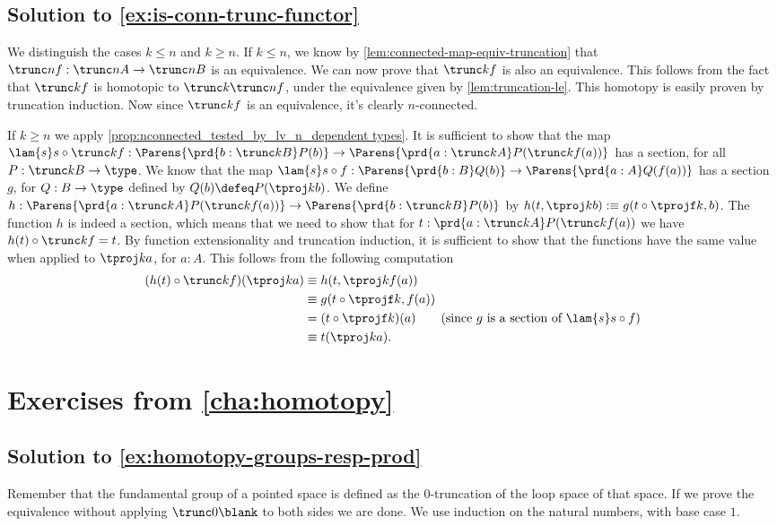 \documentclass[
%
%
11pt %
]{article}
\begin{document}
\subsection*{Solution to \cref{ex:is-conn-trunc-functor}}

We distinguish the cases $k \le n$ and $k \ge n$. If $k \le n$, we know
by \cref{lem:connected-map-equiv-truncation} that $\trunc nf : \trunc nA \to \trunc nB$ is an
equivalence. We can now prove that $\trunc kf$ is also an equivalence. This follows from the fact
that $\trunc kf$ is homotopic to $\trunc k{\trunc nf}$, under the equivalence given
by \cref{lem:truncation-le}. This homotopy is easily proven by truncation induction. Now since
$\trunc kf$ is an equivalence, it's clearly $n$-connected.

If $k \ge n$ we apply \cref{prop:nconnected_tested_by_lv_n_dependent types}. It is sufficient to
show that the map $\lam{s} s\circ \trunc kf : \Parens{\prd{b:\trunc kB}
P(b)}\to\Parens{\prd{a:\trunc kA}P(\trunc kf(a))}$ has a section, for all $P : \trunc
kB\to\type$. We know that the map $\lam{s} s\circ f :\Parens{\prd{b:B}
Q(b)}\to\Parens{\prd{a:A}Q(f(a))}$ has a section $g$, for $Q:B\to\type$ defined by $Q(b)\defeq
P(\tproj kb)$. We define $h : \Parens{\prd{a:\trunc kA}P(\trunc kf(a))}\to\Parens{\prd{b:\trunc kB}
P(b)}$ by $h(t,\tproj kb):\equiv g(t \circ \tprojf k, b)$. The function $h$ is indeed a section,
which means that we need to show that for $t : \prd{a:\trunc kA}P(\trunc kf(a))$ we have
$h(t)\circ \trunc kf = t$. By function extensionality and truncation induction, it is sufficient to
show that the functions have the same value when applied to $\tproj ka$, for $a : A$. This follows
from the following computation
\begin{align*}
  (h(t)\circ \trunc kf)(\tproj ka) & \equiv h(t, \tproj k{f(a)})\\
  & \equiv g(t \circ \tprojf k, f(a)) \\
  &= (t \circ \tprojf k)(a) \tag{since $g$ is a section of $\lam{s} s\circ f$}\\
  & \equiv t(\tproj ka).
\end{align*}

\section*{Exercises from \cref{cha:homotopy}}

\subsection*{Solution to \cref{ex:homotopy-groups-resp-prod}}
Remember that the fundamental group of a pointed space is defined as the
$0$-truncation of the loop space of that space.
If we prove the equivalence without applying $\trunc 0{\blank}$ to both sides
we are done.  We use induction on the natural numbers, with base case $1$.
\end{document}
